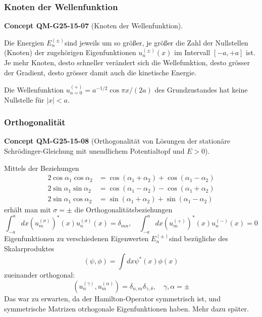 \documentclass[10pt, letterpaper]{article}
\newcommand{\CustomHeading}[3]{%
  \par\medskip\noindent%
  \textbf{#1 #2} \textnormal{(#3)}.\enskip%
}
\newenvironment{CONC}[2]{\begin{unitbox}\CustomHeading{Concept}{#1}{#2}}{\end{unitbox}}
\begin{document}
\subsubsection*{Knoten der Wellenfunktion}

\begin{CONC}{QM-G25-15-07}{Knoten der Wellenfunktion}
Die Energien $E_{n}^{( \pm)}$sind jeweils um so größer, je größer die Zahl der Nullstellen (Knoten) der zugehörigen Eigenfunktionen $u_{n}^{( \pm)}(x)$ im Intervall $[-a,+a]$ ist. Je mehr Knoten, desto schneller verändert sich die Wellefunktion, desto grösser der Gradient, desto grösser damit auch die kinetische Energie.

Die Wellenfunktion $u_{n=0}^{(+)}=a^{-1 / 2} \cos \pi x /(2 a)$ des Grundzustandes hat keine Nullstelle für $|x|<a$.
\end{CONC}



\subsubsection*{Orthogonalität}

\begin{CONC}{QM-G25-15-08}{Orthogonalität von Lösungen der stationäre Schrödinger-Gleichung mit unendlichem Potentialtopf und $E>0$}
Mittels der Beziehungen
$$
\begin{aligned}
2 \cos \alpha_{1} \cos \alpha_{2} & =\cos \left(\alpha_{1}+\alpha_{2}\right)+\cos \left(\alpha_{1}-\alpha_{2}\right) \\
2 \sin \alpha_{1} \sin \alpha_{2} & =\cos \left(\alpha_{1}-\alpha_{2}\right)-\cos \left(\alpha_{1}+\alpha_{2}\right) \\
2 \sin \alpha_{1} \cos \alpha_{2} & =\sin \left(\alpha_{1}+\alpha_{2}\right)+\sin \left(\alpha_{1}-\alpha_{2}\right)
\end{aligned}
$$
erhält man mit $\sigma= \pm$ die Orthogonalitätsbeziehungen
$$
\int_{-a}^{a} d x\left(u_{m}^{(\sigma)}\right)^{*}(x) u_{n}^{(\sigma)}(x)=\delta_{m n}, \quad \int_{-a}^{a} d x\left(u_{m}^{(+)}\right)^{*}(x) u_{n}^{(-)}(x)=0
$$
Eigenfunktionen zu verschiedenen Eigenwerten $E_{n}^{( \pm)}$sind bezügliche des Skalarproduktes
$$
(\psi, \phi)=\int d x \psi^{*}(x) \phi(x)
$$
zueinander orthogonal:
$$
\left(u_{n}^{(\gamma)}, u_{m}^{(\alpha)}\right)=\delta_{n, m} \delta_{\gamma, \delta}, \quad \gamma, \alpha= \pm
$$
Das war zu erwarten, da der Hamilton-Operator symmetrisch ist, und symmetrische Matrizen otrhogonale Eigenfunktionen haben. Mehr dazu später.
\end{CONC}
\end{document}
